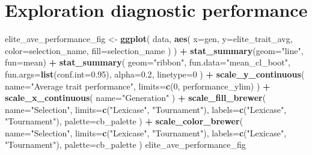 \documentclass[]{book}
\newenvironment{Shaded}{\begin{snugshade}}{\end{snugshade}}
\newcommand{\DataTypeTok}[1]{\textcolor[rgb]{0.13,0.29,0.53}{#1}}
\newcommand{\DecValTok}[1]{\textcolor[rgb]{0.00,0.00,0.81}{#1}}
\newcommand{\FloatTok}[1]{\textcolor[rgb]{0.00,0.00,0.81}{#1}}
\newcommand{\KeywordTok}[1]{\textcolor[rgb]{0.13,0.29,0.53}{\textbf{#1}}}
\newcommand{\NormalTok}[1]{#1}
\newcommand{\OperatorTok}[1]{\textcolor[rgb]{0.81,0.36,0.00}{\textbf{#1}}}
\newcommand{\StringTok}[1]{\textcolor[rgb]{0.31,0.60,0.02}{#1}}
\begin{document}
\hypertarget{exploration-diagnostic-performance}{%
\section{Exploration diagnostic performance}\label{exploration-diagnostic-performance}}

\begin{Shaded}
\begin{Highlighting}[]
\NormalTok{elite_ave_performance_fig <-}\StringTok{ }\KeywordTok{ggplot}\NormalTok{(}
\NormalTok{    data,}
    \KeywordTok{aes}\NormalTok{(}
      \DataTypeTok{x=}\NormalTok{gen,}
      \DataTypeTok{y=}\NormalTok{elite_trait_avg,}
      \DataTypeTok{color=}\NormalTok{selection_name,}
      \DataTypeTok{fill=}\NormalTok{selection_name}
\NormalTok{    )}
\NormalTok{  ) }\OperatorTok{+}
\StringTok{  }\KeywordTok{stat_summary}\NormalTok{(}\DataTypeTok{geom=}\StringTok{"line"}\NormalTok{, }\DataTypeTok{fun=}\NormalTok{mean) }\OperatorTok{+}
\StringTok{  }\KeywordTok{stat_summary}\NormalTok{(}
    \DataTypeTok{geom=}\StringTok{"ribbon"}\NormalTok{,}
    \DataTypeTok{fun.data=}\StringTok{"mean_cl_boot"}\NormalTok{,}
    \DataTypeTok{fun.args=}\KeywordTok{list}\NormalTok{(}\DataTypeTok{conf.int=}\FloatTok{0.95}\NormalTok{),}
    \DataTypeTok{alpha=}\FloatTok{0.2}\NormalTok{,}
    \DataTypeTok{linetype=}\DecValTok{0}
\NormalTok{  ) }\OperatorTok{+}
\StringTok{  }\KeywordTok{scale_y_continuous}\NormalTok{(}
    \DataTypeTok{name=}\StringTok{"Average trait performance"}\NormalTok{,}
    \DataTypeTok{limits=}\KeywordTok{c}\NormalTok{(}\DecValTok{0}\NormalTok{, performance_ylim)}
\NormalTok{  ) }\OperatorTok{+}
\StringTok{  }\KeywordTok{scale_x_continuous}\NormalTok{(}
    \DataTypeTok{name=}\StringTok{"Generation"}
\NormalTok{  ) }\OperatorTok{+}
\StringTok{  }\KeywordTok{scale_fill_brewer}\NormalTok{(}
    \DataTypeTok{name=}\StringTok{"Selection"}\NormalTok{,}
    \DataTypeTok{limits=}\KeywordTok{c}\NormalTok{(}\StringTok{"Lexicase"}\NormalTok{, }\StringTok{"Tournament"}\NormalTok{),}
    \DataTypeTok{labels=}\KeywordTok{c}\NormalTok{(}\StringTok{"Lexicase"}\NormalTok{, }\StringTok{"Tournament"}\NormalTok{),}
    \DataTypeTok{palette=}\NormalTok{cb_palette}
\NormalTok{  ) }\OperatorTok{+}
\StringTok{  }\KeywordTok{scale_color_brewer}\NormalTok{(}
    \DataTypeTok{name=}\StringTok{"Selection"}\NormalTok{,}
    \DataTypeTok{limits=}\KeywordTok{c}\NormalTok{(}\StringTok{"Lexicase"}\NormalTok{, }\StringTok{"Tournament"}\NormalTok{),}
    \DataTypeTok{labels=}\KeywordTok{c}\NormalTok{(}\StringTok{"Lexicase"}\NormalTok{, }\StringTok{"Tournament"}\NormalTok{),}
    \DataTypeTok{palette=}\NormalTok{cb_palette}
\NormalTok{  )}
\NormalTok{elite_ave_performance_fig}
\end{Highlighting}
\end{Shaded}
\end{document}
